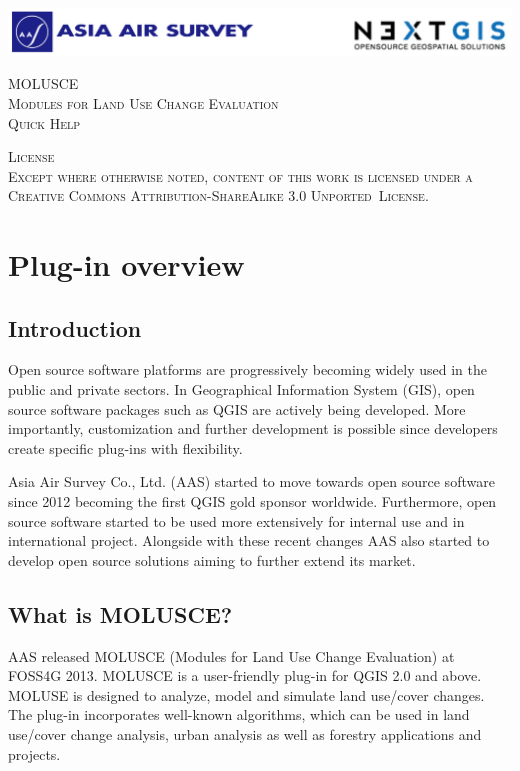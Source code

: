 \documentclass{report}
\begin{document}
\begin{titlepage}


\center %
 
\includegraphics[width=1.0\textwidth]{img/logos.png}

\vfill %

\textsc{\LARGE MOLUSCE}\\[1.5cm] 
\textsc{\Large Modules for Land Use Change Evaluation}\\[0.5cm] 
\textsc{\large Quick Help}\\[0.5cm]

\vfill %

 
\textsc{
License\\
Except where otherwise noted, content of this work is licensed under a Creative
Commons Attribution-ShareAlike 3.0 Unported~License.
}

\end{titlepage}


\tableofcontents


\chapter{Plug-in overview}
\section{Introduction}

Open source software platforms are progressively becoming widely used in the public and private
sectors. In Geographical Information System (GIS), open source software packages such as QGIS
are actively being developed. More importantly, customization and further development is possible
since developers create specific plug-ins with flexibility.

Asia Air Survey Co., Ltd. (AAS) started to move towards open source software since 2012
becoming the first QGIS gold sponsor worldwide. Furthermore, open source software started to be
used more extensively for internal use and in international project. Alongside with these recent
changes AAS also started to develop open source solutions aiming to further extend its market.


\section{What is MOLUSCE?}
AAS released MOLUSCE (Modules for Land Use Change Evaluation) at FOSS4G 2013.
MOLUSCE is a user-friendly plug-in for QGIS 2.0 and above. MOLUSE is designed to analyze,
model and simulate land use/cover changes. The plug-in incorporates well-known algorithms,
which can be used in land use/cover change analysis, urban analysis as well as forestry applications
and projects.
\end{document}
